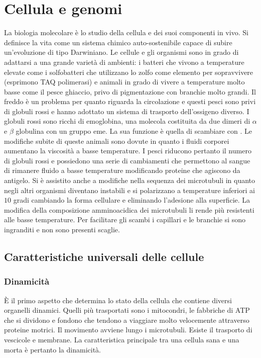 \section{Cellula e genomi}
La biologia molecolare \`e lo studio della cellula e dei suoi componenti in vivo. Si definisce la vita come un sistema chimico auto-sostenibile capace di subire un'evoluzione di tipo 
Darwiniano. Le cellule e gli organismi sono in grado di adattarsi a una grande variet\`a di ambienti: i batteri che vivono a temperature elevate come i solfobatteri che utilizzano lo 
zolfo come elemento per sopravvivere (esprimono TAQ polimerasi) e animali in grado di vivere a temperature molto basse come il pesce ghiaccio, privo di pigmentazione con branchie molto
grandi. Il freddo \`e un problema per quanto riguarda la circolazione e questi pesci sono privi di globuli rossi e hanno adottato un sistema di trasporto dell'ossigeno diverso. I globuli
rossi sono ricchi di emoglobina, una molecola costituita da due dimeri di $\alpha$ e $\beta$ globulina con un gruppo eme. La sua funzione \`e quella di scambiare \emph{} con 
\emph{}. Le modifiche subite di queste animali sono dovute in quanto i fluidi corporei aumentano la viscosit\`a a basse temperature. I pesci riducono pertanto il numero di 
globuli rossi e possiedono una serie di cambiamenti che permettono al sangue di rimanere fluido a basse temperature modificando proteine che agiscono da antigelo. Si \`e assistito anche 
a modifiche nella sequenza dei microtubuli in quanto negli altri organismi diventano instabili e si polarizzano a temperature inferiori ai $10$ gradi cambiando la forma cellulare e 
eliminando l'adesione alla superficie. La modifica della composizione amminoacidica dei microtubuli li rende pi\`u resistenti alle basse temperature. Per facilitare gli scambi i 
capillari e le branchie si sono ingranditi e non sono presenti scaglie. 
\subsection{Caratteristiche universali delle cellule}
\subsubsection{Dinamicit\`a}
\`E il primo aspetto che determina lo stato della cellula che contiene diversi organelli dinamici. Quelli pi\`u trasportati sono i mitocondri, le fabbriche di ATP che si dividono e 
fondono che tendono a viaggiare molto velocemente attraverso proteine motrici. Il movimento avviene lungo i microtubuli. Esiste il trasporto di vescicole e membrane. La caratteristica
principale tra una cellula sana e una morta \`e pertanto la dinamicit\`a. 
